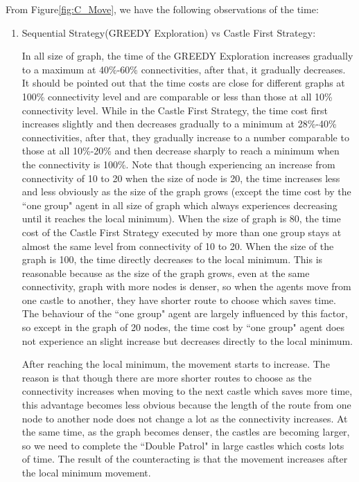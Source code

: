 From Figure\ref{fig:C_Move}, we have the following observations of the time:
\begin{enumerate}
\item Sequential Strategy(GREEDY Exploration) vs Castle First Strategy: 

In all size of graph, the time of the GREEDY Exploration increases gradually to a maximum at 40\%-60\% connectivities, after that, it gradually decreases. It should be pointed out that the time costs are close for different graphs at 100\% connectivity level and are comparable or less than those at all 10\% connectivity level. While in the Castle First Strategy, the time cost first increases slightly and then decreases gradually to a minimum at 28\%-40\% connectivities, after that, they gradually increase to a number comparable to those at all 10\%-20\% and then decrease sharply to reach a minimum when the connectivity is 100\%. Note that though experiencing an increase from connectivity of 10 to 20 when the size of node is 20, the time increases less and less obviously as the size of the graph grows (except the time cost by the  ``one group" agent in all size of graph which always experiences decreasing until it reaches the local minimum). When the size of graph is 80, the time cost of the Castle First Strategy executed by more than one group stays at almost the same level from connectivity of 10 to 20. When the size of the graph is 100, the time directly decreases to the local minimum. This is reasonable because as the size of the graph grows, even at the same connectivity, graph with more nodes is denser, so when the agents move from one castle to another, they have shorter route to choose which saves time. The behaviour of the ``one group" agent are largely influenced by this factor, so except in the graph of 20 nodes, the time cost by  ``one group" agent does not experience an slight increase but decreases directly to the local minimum.    

After reaching the local minimum, the movement starts to increase. The reason is that though there are more shorter routes to choose as the connectivity increases when moving to the next castle which saves more time, this advantage becomes less obvious because the length of the route from one node to another node does not change a lot as the connectivity increases. At the same time, as the graph becomes denser, the castles are becoming larger, so we need to complete the ``Double Patrol" in large castles which costs lots of time. The result of the counteracting is that the movement increases after the local minimum movement. 


\end{enumerate}
